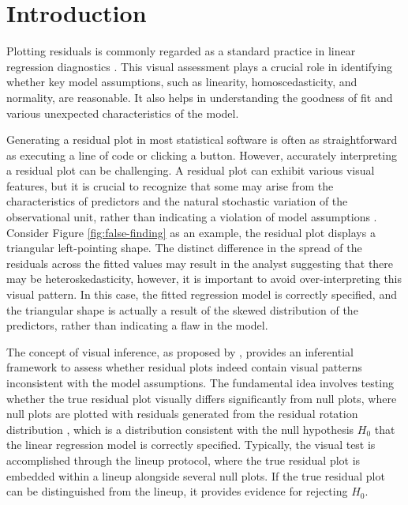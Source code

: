\documentclass[]{interact}
\theoremstyle{plain}%
\theoremstyle{definition}
\theoremstyle{remark}
\begin{document}
\section{Introduction}\label{sec-model-introduction}

Plotting residuals is commonly regarded as a standard practice in linear
regression diagnostics \citep{belsley1980regression, cook1982residuals}.
This visual assessment plays a crucial role in identifying whether key
model assumptions, such as linearity, homoscedasticity, and normality,
are reasonable. It also helps in understanding the goodness of fit and
various unexpected characteristics of the model.

Generating a residual plot in most statistical software is often as
straightforward as executing a line of code or clicking a button.
However, accurately interpreting a residual plot can be challenging. A
residual plot can exhibit various visual features, but it is crucial to
recognize that some may arise from the characteristics of predictors and
the natural stochastic variation of the observational unit, rather than
indicating a violation of model assumptions \citep{li2024plot}. Consider
Figure \ref{fig:false-finding} as an example, the residual plot displays
a triangular left-pointing shape. The distinct difference in the spread
of the residuals across the fitted values may result in the analyst
suggesting that there may be heteroskedasticity, however, it is
important to avoid over-interpreting this visual pattern. In this case,
the fitted regression model is correctly specified, and the triangular
shape is actually a result of the skewed distribution of the predictors,
rather than indicating a flaw in the model.

The concept of visual inference, as proposed by
\citet{buja2009statistical}, provides an inferential framework to assess
whether residual plots indeed contain visual patterns inconsistent with
the model assumptions. The fundamental idea involves testing whether the
true residual plot visually differs significantly from null plots, where
null plots are plotted with residuals generated from the residual
rotation distribution \citep{langsrud2005rotation}, which is a
distribution consistent with the null hypothesis \(H_0\) that the linear
regression model is correctly specified. Typically, the visual test is
accomplished through the lineup protocol, where the true residual plot
is embedded within a lineup alongside several null plots. If the true
residual plot can be distinguished from the lineup, it provides evidence
for rejecting \(H_0\).
\end{document}
